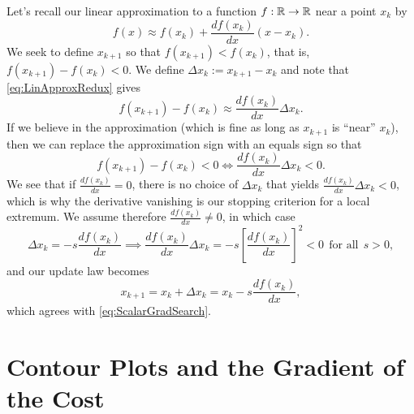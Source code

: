 \begin{tcolorbox}[title=\textbf{Linear Approximation to the Rescue!}]

Let's recall our linear approximation to a function $f : \mathbb R \to \mathbb R$ near a point $x_k$ by
\begin{equation}
    \label{eq:LinApproxRedux}
    f(x) \approx f(x_k) + \frac{df(x_k)}{dx} \left(x-x_k  \right).
\end{equation}
We seek to define $x_{k+1}$ so that $f(x_{k+1}) < f(x_k)$, that is, $f(x_{k+1}) - f(x_k) < 0$. We define $\Delta x_k := x_{k+1}-x_k$ and note that
\eqref{eq:LinApproxRedux} gives
\begin{equation}
    \label{eq:LinApproxRedux02}
    f(x_{k+1}) - f(x_k) \approx \frac{df(x_k)}{dx} \Delta x_k.
\end{equation} 
If we believe in the approximation (which is fine as long as $x_{k+1}$ is ``near'' $x_k$), then we can replace the approximation sign with an equals sign so that
\begin{equation}
    \label{eq:LinApproxRedux03}
    f(x_{k+1}) - f(x_k) < 0 \iff  \frac{df(x_k)}{dx} \Delta x_k < 0.
\end{equation} 
We see that if $ \frac{df(x_k)}{dx} =0$,  there is no choice of  $\Delta x_k$ that yields $  \frac{df(x_k)}{dx} \Delta x_k < 0$, which is why the derivative vanishing is our stopping criterion for a local extremum. We assume  therefore $ \frac{df(x_k)}{dx} \neq 0$, in which case
$$  \Delta x_k = - s\frac{df(x_k)}{dx} \implies \frac{df(x_k)}{dx} \Delta x_k = -s \left[  \frac{df(x_k)}{dx} \right]^2 < 0~~\text{for all}~~s>0, $$
and our update law becomes 
$$x_{k+1} = x_k + \Delta x_k =  x_k - s\frac{df(x_k)}{dx},$$
which agrees with \eqref{eq:ScalarGradSearch}. 
\end{tcolorbox}



\section{Contour Plots and the Gradient of the Cost}


